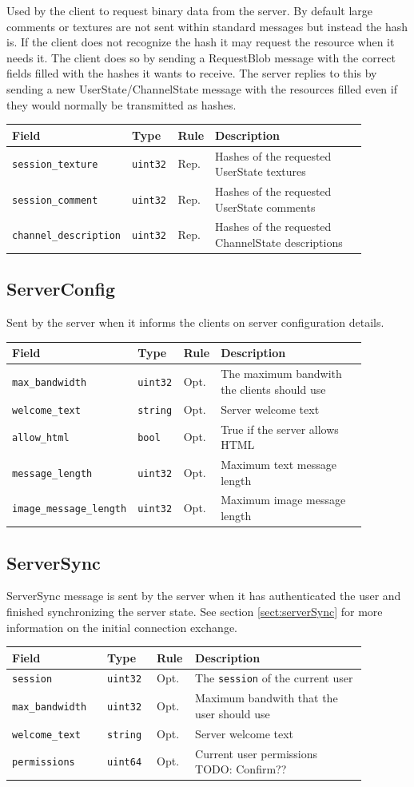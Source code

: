 \documentclass[11pt]{article} %
\newenvironment{mumbleMessageEx}
{%
	\small
	\renewcommand\arraystretch{1.5}
	\begin{tabular}{p{0.25\linewidth}p{0.13\linewidth}p{0.05\linewidth}p{0.45\linewidth}}
	Field & Type & Rule & Description \\
	\hline
}
{%
	\end{tabular}
	\renewcommand\arraystretch{1.0}
}
\newcommand{\mumbleMessageExItem}[4]{ \texttt{#1} & \texttt{#2} & #3 & #4 \\ }
\begin{document}
Used by the client to request binary data from the server. By default large comments or textures are not sent within standard messages but instead the hash is. If the client does not recognize the hash it may request the resource when it needs it. The client does so by sending a RequestBlob message with the correct fields filled with the hashes it wants to receive. The server replies to this by sending a new UserState/ChannelState message with the resources filled even if they would normally be transmitted as hashes.

\begin{mumbleMessageEx}
\mumbleMessageExItem{session\_texture}{uint32}{Rep.}{Hashes of the requested UserState textures}
\mumbleMessageExItem{session\_comment}{uint32}{Rep.}{Hashes of the requested UserState comments}
\mumbleMessageExItem{channel\_description}{uint32}{Rep.}{Hashes of the requested ChannelState descriptions}
\end{mumbleMessageEx}

\subsection{ServerConfig}
\label{msg:serverConfig}

Sent by the server when it informs the clients on server configuration details.

\begin{mumbleMessageEx}
\mumbleMessageExItem{max\_bandwidth}{uint32}{Opt.}{The maximum bandwith the clients should use}
\mumbleMessageExItem{welcome\_text}{string}{Opt.}{Server welcome text}
\mumbleMessageExItem{allow\_html}{bool}{Opt.}{True if the server allows HTML}
\mumbleMessageExItem{message\_length}{uint32}{Opt.}{Maximum text message length}
\mumbleMessageExItem{image\_message\_length}{uint32}{Opt.}{Maximum image message length}
\end{mumbleMessageEx}

\subsection{ServerSync}
\label{msg:serverSync}

ServerSync message is sent by the server when it has authenticated the user and finished synchronizing the server state. See section \ref{sect:serverSync} for more information on the initial connection exchange.

\begin{mumbleMessageEx}
\mumbleMessageExItem{session}{uint32}{Opt.}{The \texttt{session} of the current user}
\mumbleMessageExItem{max\_bandwidth}{uint32}{Opt.}{Maximum bandwith that the user should use}
\mumbleMessageExItem{welcome\_text}{string}{Opt.}{Server welcome text}
\mumbleMessageExItem{permissions}{uint64}{Opt.}{Current user permissions TODO: Confirm??}
\end{mumbleMessageEx}
\end{document}
